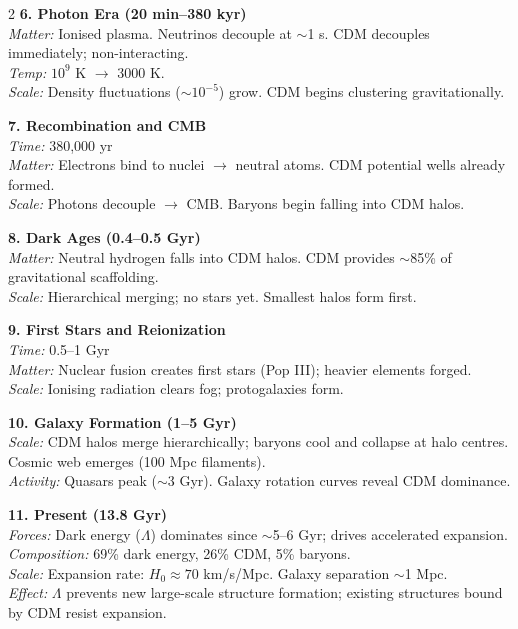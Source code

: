 \begin{center}
\begin{tcolorbox}
\begin{multicols}{2}
{\bfseries 6. Photon Era (20 min–380 kyr)}\\
\textit{Matter:} Ionised plasma. Neutrinos decouple at $\sim$1 s. CDM decouples immediately; non-interacting.\\
\textit{Temp:} $10^9$ K $\rightarrow$ 3000 K.\\
\textit{Scale:} Density fluctuations ($\sim10^{-5}$) grow. CDM begins clustering gravitationally.

\columnbreak

{\bfseries 7. Recombination and CMB}\\
\textit{Time:} 380,000 yr\\
\textit{Matter:} Electrons bind to nuclei $\rightarrow$ neutral atoms. CDM potential wells already formed.\\
\textit{Scale:} Photons decouple $\rightarrow$ CMB. Baryons begin falling into CDM halos.

{\bfseries 8. Dark Ages (0.4–0.5 Gyr)}\\
\textit{Matter:} Neutral hydrogen falls into CDM halos. CDM provides $\sim$85\% of gravitational scaffolding.\\
\textit{Scale:} Hierarchical merging; no stars yet. Smallest halos form first.

{\bfseries 9. First Stars and Reionization}\\
\textit{Time:} 0.5–1 Gyr\\
\textit{Matter:} Nuclear fusion creates first stars (Pop III); heavier elements forged.\\
\textit{Scale:} Ionising radiation clears fog; protogalaxies form.

{\bfseries 10. Galaxy Formation (1–5 Gyr)}\\
\textit{Scale:} CDM halos merge hierarchically; baryons cool and collapse at halo centres. Cosmic web emerges (100 Mpc filaments).\\
\textit{Activity:} Quasars peak ($\sim$3 Gyr). Galaxy rotation curves reveal CDM dominance.

{\bfseries 11. Present (13.8 Gyr)}\\
\textit{Forces:} Dark energy ($\Lambda$) dominates since $\sim$5–6 Gyr; drives accelerated expansion.\\
\textit{Composition:} 69\% dark energy, 26\% CDM, 5\% baryons.\\
\textit{Scale:} Expansion rate: $H_0 \approx 70$ km/s/Mpc. Galaxy separation $\sim$1 Mpc.\\
\textit{Effect:} $\Lambda$ prevents new large-scale structure formation; existing structures bound by CDM resist expansion.


\end{multicols}
\end{tcolorbox}
\end{center}
